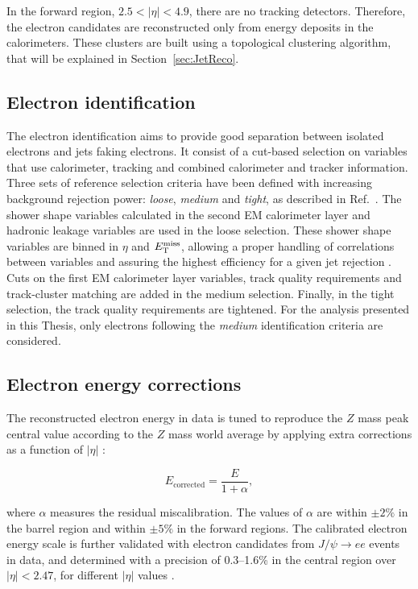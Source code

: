 In the forward region, $2.5 < |\eta| < 4.9$, there are no tracking detectors. Therefore, the electron candidates are reconstructed only from energy deposits in the calorimeters. These clusters are built using a topological clustering algorithm, that will be explained in Section~\ref{sec:JetReco}.

\subsection{Electron identification}
    \label{subsec:ElectronIdentification}

The electron identification aims to provide good separation between isolated electrons and jets faking electrons.
It consist of a cut-based selection on variables that use calorimeter, tracking and combined calorimeter and tracker information.
Three sets of reference selection criteria have been defined with increasing background rejection power: \textit{loose}, \textit{medium} and \textit{tight}, as described in Ref.~\cite{Aad:2011mk}.
The shower shape variables calculated in the second EM calorimeter layer and hadronic leakage variables are used in the loose selection.
These shower shape variables are binned in $\eta$ and $E_{\mathrm{T}}^{\mathrm{miss}}$, allowing a proper handling of correlations between variables and assuring the highest efficiency for a given jet rejection \cite{Aad:2014fxa}.
Cuts on the first EM calorimeter layer variables, track quality requirements and track-cluster matching are added in the medium selection.
Finally, in the tight selection, the track quality requirements are tightened.
For the analysis presented in this Thesis, only electrons following the \textit{medium} identification criteria are considered.


\subsection{Electron energy corrections}
    \label{subsec:ElectronEnergyCorrections}

The reconstructed electron energy in data is tuned to reproduce the $Z$ mass peak central value according to the $Z$ mass world average by applying extra corrections as a function of $|\eta|$ \cite{Aad:2011mk}:

\begin{equation}
E_{\text{corrected}} = \frac{E}{1+\alpha},
\label{eq:ElectronEnergyCalibration}
\end{equation}

\noindent where $\alpha$ measures the residual miscalibration. The values of $\alpha$ are within $\pm 2 \%$ in the barrel region and within $\pm 5 \%$ in the forward regions.
The calibrated electron energy scale is further validated with electron candidates from $J/\psi\rightarrow ee$ events in data, and determined with a precision of 0.3--1.6\% in the central region over $|\eta|<2.47$, for different $|\eta|$ values \cite{Aad:2014nim}.

